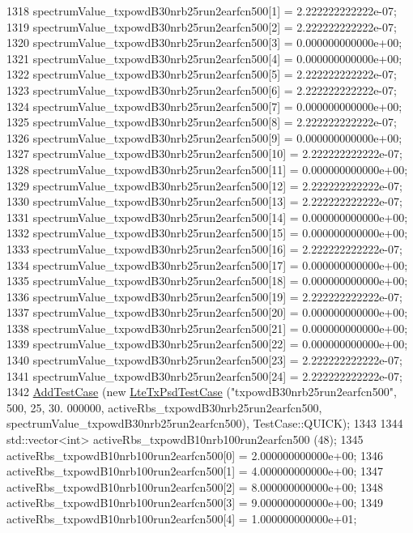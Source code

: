 \begin{DoxyCode}
1318   spectrumValue\_txpowdB30nrb25run2earfcn500[1] = 2.222222222222e-07;
1319   spectrumValue\_txpowdB30nrb25run2earfcn500[2] = 2.222222222222e-07;
1320   spectrumValue\_txpowdB30nrb25run2earfcn500[3] = 0.000000000000e+00;
1321   spectrumValue\_txpowdB30nrb25run2earfcn500[4] = 0.000000000000e+00;
1322   spectrumValue\_txpowdB30nrb25run2earfcn500[5] = 2.222222222222e-07;
1323   spectrumValue\_txpowdB30nrb25run2earfcn500[6] = 2.222222222222e-07;
1324   spectrumValue\_txpowdB30nrb25run2earfcn500[7] = 0.000000000000e+00;
1325   spectrumValue\_txpowdB30nrb25run2earfcn500[8] = 2.222222222222e-07;
1326   spectrumValue\_txpowdB30nrb25run2earfcn500[9] = 0.000000000000e+00;
1327   spectrumValue\_txpowdB30nrb25run2earfcn500[10] = 2.222222222222e-07;
1328   spectrumValue\_txpowdB30nrb25run2earfcn500[11] = 0.000000000000e+00;
1329   spectrumValue\_txpowdB30nrb25run2earfcn500[12] = 2.222222222222e-07;
1330   spectrumValue\_txpowdB30nrb25run2earfcn500[13] = 2.222222222222e-07;
1331   spectrumValue\_txpowdB30nrb25run2earfcn500[14] = 0.000000000000e+00;
1332   spectrumValue\_txpowdB30nrb25run2earfcn500[15] = 0.000000000000e+00;
1333   spectrumValue\_txpowdB30nrb25run2earfcn500[16] = 2.222222222222e-07;
1334   spectrumValue\_txpowdB30nrb25run2earfcn500[17] = 0.000000000000e+00;
1335   spectrumValue\_txpowdB30nrb25run2earfcn500[18] = 0.000000000000e+00;
1336   spectrumValue\_txpowdB30nrb25run2earfcn500[19] = 2.222222222222e-07;
1337   spectrumValue\_txpowdB30nrb25run2earfcn500[20] = 0.000000000000e+00;
1338   spectrumValue\_txpowdB30nrb25run2earfcn500[21] = 0.000000000000e+00;
1339   spectrumValue\_txpowdB30nrb25run2earfcn500[22] = 0.000000000000e+00;
1340   spectrumValue\_txpowdB30nrb25run2earfcn500[23] = 2.222222222222e-07;
1341   spectrumValue\_txpowdB30nrb25run2earfcn500[24] = 2.222222222222e-07;
1342   \hyperlink{classns3_1_1TestCase_a3718088e3eefd5d6454569d2e0ddd835}{AddTestCase} (\textcolor{keyword}{new} \hyperlink{classLteTxPsdTestCase}{LteTxPsdTestCase} (\textcolor{stringliteral}{"txpowdB30nrb25run2earfcn500"}, 500, 25, 30.
      000000, activeRbs\_txpowdB30nrb25run2earfcn500, spectrumValue\_txpowdB30nrb25run2earfcn500), TestCase::QUICK);
1343 
1344   std::vector<int> activeRbs\_txpowdB10nrb100run2earfcn500 (48);
1345   activeRbs\_txpowdB10nrb100run2earfcn500[0] = 2.000000000000e+00;
1346   activeRbs\_txpowdB10nrb100run2earfcn500[1] = 4.000000000000e+00;
1347   activeRbs\_txpowdB10nrb100run2earfcn500[2] = 8.000000000000e+00;
1348   activeRbs\_txpowdB10nrb100run2earfcn500[3] = 9.000000000000e+00;
1349   activeRbs\_txpowdB10nrb100run2earfcn500[4] = 1.000000000000e+01;

\end{DoxyCode}
